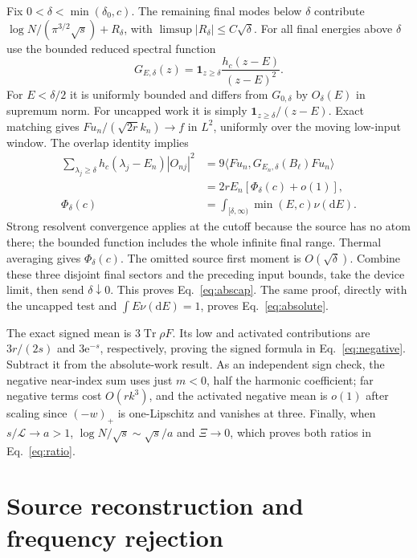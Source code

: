 \documentclass[aps,pra,reprint,superscriptaddress,longbibliography]{revtex4-2}
\newcommand{\Tr}{\operatorname{Tr}}
\newcommand{\dd}{\mathrm d}
\newcommand{\ee}{\mathrm e}
\newcommand{\ip}[2]{\langle#1,#2\rangle}
\newcommand{\one}{\mathbf 1}
\begin{document}
Fix $0<\delta<\min(\delta_0,c)$. The remaining final modes below
$\delta$ contribute $\log N/(\pi^{3/2}\sqrt s)+R_\delta$, with
$\limsup|R_\delta|\le C\sqrt\delta$. For all final energies above
$\delta$ use the bounded reduced spectral function
\begin{equation}
 G_{E,\delta}(z)=\one_{z\ge\delta}\frac{h_c(z-E)}{(z-E)^2}.
                                                               \label{eq:apreducedtest}
\end{equation}
For $E<\delta/2$ it is uniformly bounded and differs from
$G_{0,\delta}$ by $O_\delta(E)$ in supremum norm. For uncapped work
it is simply $\one_{z\ge\delta}/(z-E)$. Exact matching gives
$Fu_n/(\sqrt{2r}k_n)\to f$ in $L^2$, uniformly over the moving
low-input window. The overlap identity implies
\begin{align}
 \sum_{\lambda_j\ge\delta}h_c(\lambda_j-E_n)|O_{nj}|^2
 &=9\ip{Fu_n}{G_{E_n,\delta}(B_\ell)Fu_n}\nonumber\\
 &=2rE_n[\Phi_\delta(c)+o(1)],\nonumber\\
 \Phi_\delta(c)&=\int_{[\delta,\infty)}\min(E,c)\nu(\dd E).
                                                               \label{eq:apsourcematch}
\end{align}
Strong resolvent convergence applies at the cutoff because the
source has no atom there; the bounded function includes the whole
infinite final range. Thermal averaging gives $\Phi_\delta(c)$.
The omitted source first moment is $O(\sqrt\delta)$. Combine these
three disjoint final sectors and the preceding input bounds, take
the device limit, then send $\delta\downarrow0$. This proves
Eq.~\eqref{eq:abscap}. The same proof, directly with the uncapped
test and $\int E\nu(\dd E)=1$, proves Eq.~\eqref{eq:absolute}.

The exact signed mean is $3\Tr\rho F$. Its low and activated
contributions are $3r/(2s)$ and $3\ee^{-s}$, respectively, proving
the signed formula in Eq.~\eqref{eq:negative}. Subtract it from
the absolute-work result. As an independent sign check, the negative
near-index sum uses just $m<0$, half the harmonic coefficient; far
negative terms cost $O(rk^3)$, and the activated negative mean is
$o(1)$ after scaling since $(-w)_+$ is one-Lipschitz and vanishes
at three. Finally, when $s/\mathcal L\to a>1$,
$\log N/\sqrt s\sim\sqrt s/a$ and $\Xi\to0$, which proves both
ratios in Eq.~\eqref{eq:ratio}.

\section{Source reconstruction and frequency rejection}
\label{app:reconstruction}
\end{document}
